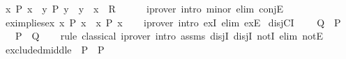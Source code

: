 \begin{isabellebody}
\ {\isachardoublequoteopen}{\isasymAnd}x{\isachardot}{\kern0pt}\ P\ x\ {\isasymand}\ {\isacharparenleft}{\kern0pt}{\isasymforall}y{\isachardot}{\kern0pt}\ P\ y\ {\isasymlongrightarrow}\ y\ {\isacharequal}{\kern0pt}\ x{\isacharparenright}{\kern0pt}\ {\isasymLongrightarrow}\ R{\isachardoublequoteclose}\isanewline
\ \ \ \ \isamarkupfalse%
\ {\isacharparenleft}{\kern0pt}iprover\ intro{\isacharcolon}{\kern0pt}\ minor\ elim{\isacharcolon}{\kern0pt}\ conjE{\isacharparenright}{\kern0pt}\isanewline
{}\isamarkupfalse%
%
\endisatagproof
{\isafoldproof}%
%
\isadelimproof
\isanewline
%
\endisadelimproof
\isanewline
{}\isamarkupfalse%
\ ex{}{\isacharunderscore}{\kern0pt}implies{\isacharunderscore}{\kern0pt}ex{\isacharcolon}{\kern0pt}\ {\isachardoublequoteopen}{\isasymexists}{\isacharbang}{\kern0pt}x{\isachardot}{\kern0pt}\ P\ x\ {\isasymLongrightarrow}\ {\isasymexists}x{\isachardot}{\kern0pt}\ P\ x{\isachardoublequoteclose}\isanewline
%
\isadelimproof
\ \ %
\endisadelimproof
%
\isatagproof
{}\isamarkupfalse%
\ {\isacharparenleft}{\kern0pt}iprover\ intro{\isacharcolon}{\kern0pt}\ exI\ elim{\isacharcolon}{\kern0pt}\ ex{}E{\isacharparenright}{\kern0pt}%
\endisatagproof
{\isafoldproof}%
%
\isadelimproof
%
\endisadelimproof
%
\isadelimdocument
%
\endisadelimdocument
%
\isatagdocument
%
\isamarkuptrue%
%
\endisatagdocument
{\isafolddocument}%
%
\isadelimdocument
%
\endisadelimdocument
{}\isamarkupfalse%
\ disjCI{\isacharcolon}{\kern0pt}\isanewline
\ \ \ {\isachardoublequoteopen}{\isasymnot}\ Q\ {\isasymLongrightarrow}\ P{\isachardoublequoteclose}\isanewline
\ \ \ {\isachardoublequoteopen}P\ {\isasymor}\ Q{\isachardoublequoteclose}\isanewline
%
\isadelimproof
\ \ %
\endisadelimproof
%
\isatagproof
{}\isamarkupfalse%
\ {\isacharparenleft}{\kern0pt}rule\ classical{\isacharparenright}{\kern0pt}\ {\isacharparenleft}{\kern0pt}iprover\ intro{\isacharcolon}{\kern0pt}\ assms\ disjI{}\ disjI{}\ notI\ elim{\isacharcolon}{\kern0pt}\ notE{\isacharparenright}{\kern0pt}%
\endisatagproof
{\isafoldproof}%
%
\isadelimproof
\isanewline
%
\endisadelimproof
\isanewline
{}\isamarkupfalse%
\ excluded{\isacharunderscore}{\kern0pt}middle{\isacharcolon}{\kern0pt}\ {\isachardoublequoteopen}{\isasymnot}\ P\ {\isasymor}\ P{\isachardoublequoteclose}\isanewline
%
\isadelimproof
\ \ %
\endisadelimproof
%
\isatagproof
{}\isamarkupfalse%

\end{isabellebody}
